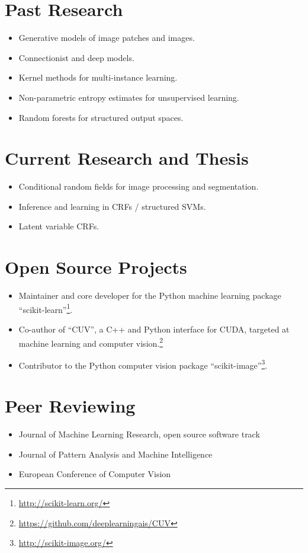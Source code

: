 \documentclass[a4paper,11pt]{article}
\begin{document}
\section{Past Research}
\begin{itemize}
    \item Generative models of image patches and images.
    \item Connectionist and deep models.
    \item Kernel methods for multi-instance learning.
    \item Non-parametric entropy estimates for unsupervised learning.
    \item Random forests for structured output spaces.
\end{itemize}

\section{Current Research and Thesis}
\begin{itemize}
    \item Conditional random fields for image processing and segmentation.
    \item Inference and learning in CRFs / structured SVMs.
    \item Latent variable CRFs.
\end{itemize}

\section{Open Source Projects}
\begin{itemize}
    \item Maintainer and core developer for the Python machine learning package ``scikit-learn''\footnote{\url{http://scikit-learn.org/}}.
    \item Co-author of ``CUV'', a C++ and Python interface for CUDA,
        targeted at machine learning and computer vision.\footnote{\url{https://github.com/deeplearningais/CUV}}
    \item Contributor to the Python computer vision package ``scikit-image''\footnote{\url{http://scikit-image.org/}}.
\end{itemize}
\pagebreak

\section{Peer Reviewing}
\begin{itemize}
    \item Journal of Machine Learning Research, open source software track
    \item Journal of Pattern Analysis and Machine Intelligence
    \item European Conference of Computer Vision
\end{itemize}
\end{document}
